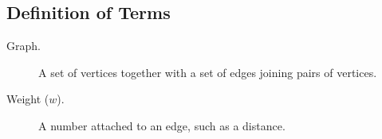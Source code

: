 \subsection{Definition of Terms}
\begin{description}
    \item[Graph.] A set of vertices together with a set of edges joining pairs of vertices.
    \item[Weight ($w$).] A number attached to an edge, such as a distance.
\end{description}
